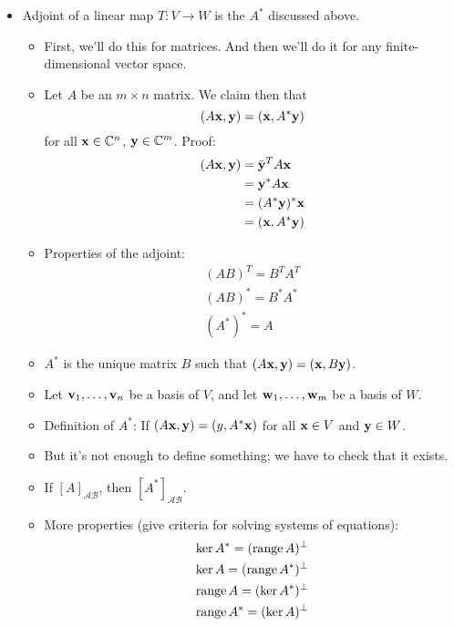 \documentclass[../../notes.tex]{subfiles}
\begin{document}
\begin{itemize}
    \item Adjoint of a linear map $T:V\to W$ is the $A^*$ discussed above.
    \begin{itemize}
        \item First, we'll do this for matrices. And then we'll do it for any finite-dimensional vector space.
        \item Let $A$ be an $m\times n$ matrix. We claim then that
        \begin{equation*}
            (A\mathbf{x},\mathbf{y}) = (\mathbf{x},A^*\mathbf{y})
        \end{equation*}
        for all $\mathbf{x}\in\mathbb{C}^n$, $\mathbf{y}\in\mathbb{C}^m$. Proof:
        \begin{align*}
            (A\mathbf{x},\mathbf{y}) &= \bar{\mathbf{y}}^TA\mathbf{x}\\
            &= \mathbf{y}^*A\mathbf{x}\\
            &= (A^*\mathbf{y})^*\mathbf{x}\\
            &= (\mathbf{x},A^*\mathbf{y})
        \end{align*}
        \item Properties of the adjoint:
        \begin{gather*}
            (AB)^T = B^TA^T\\
            (AB)^* = B^*A^*\\
            (A^*)^* = A
        \end{gather*}
        \item $A^*$ is the unique matrix $B$ such that $(A\mathbf{x},\mathbf{y})=(\mathbf{x},B\mathbf{y})$.
        \item Let $\mathbf{v}_1,\dots,\mathbf{v}_n$ be a basis of $V$, and let $\mathbf{w}_1,\dots,\mathbf{w}_m$ be a basis of $W$.
        \item Definition of $A^*$: If $(A\mathbf{x},\mathbf{y})=(y,A^*\mathbf{x})$ for all $\mathbf{x}\in V$ and $\mathbf{y}\in W$.
        \item But it's not enough to define something; we have to check that it exists.
        \item If $[A]_{\mathcal{A}\mathcal{B}}$, then $[A^*]_{\mathcal{A}\mathcal{B}}$.
        \item More properties (give criteria for solving systems of equations):
        \begin{gather*}
            \ker A^* = (\operatorname{range} A)^\perp\\
            \ker A = (\operatorname{range} A^*)^\perp\\
            \operatorname{range} A = (\ker A^*)^\perp\\
            \operatorname{range} A^* = (\ker A)^\perp
        \end{gather*}
        \begin{itemize}

\end{itemize}
\end{itemize}
\end{itemize}
\end{document}
